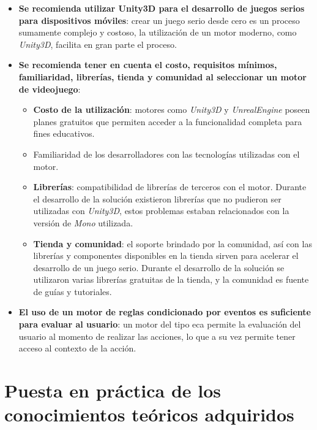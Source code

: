 \begin{itemize}

\item \textbf{Se recomienda utilizar Unity3D para el desarrollo de juegos serios para dispositivos móviles}: crear un juego serio desde cero es un proceso sumamente complejo y costoso, la utilización de un motor moderno, como \emph{Unity3D}, facilita en gran parte el proceso.

\item \textbf{Se recomienda tener en cuenta el costo, requisitos mínimos, familiaridad, librerías, tienda y comunidad al seleccionar un motor de videojuego}:

    \begin{itemize}

    \item \textbf{Costo de la utilización}: motores como \emph{Unity3D} y \emph{UnrealEngine} poseen planes gratuitos que permiten acceder a  la funcionalidad completa para fines educativos.

    \item Familiaridad de los desarrolladores con las tecnologías utilizadas con el motor.

    \item \textbf{Librerías}: compatibilidad de librerías de terceros con el motor. Durante el desarrollo de la solución existieron librerías que no pudieron ser utilizadas con \emph{Unity3D}, estos problemas estaban relacionados con la versión de \emph{Mono} utilizada.

    \item \textbf{Tienda y comunidad}: el soporte brindado  por la comunidad, así con las librerías y componentes disponibles en la tienda sirven para acelerar el desarrollo de un juego serio. Durante el desarrollo de la solución se utilizaron varias librerías gratuitas de la tienda, y la comunidad es fuente de guías y tutoriales.

    \end{itemize}

\item \textbf{El uso de un motor de reglas condicionado por eventos es suficiente para evaluar al usuario}: un motor del tipo \gls{eca} permite la evaluación del usuario al momento de realizar las acciones, lo que a su vez permite tener acceso al contexto de la acción.

\end{itemize}

\section[Puesta en práctica de conocimientos teóricos]%
{Puesta en práctica de los conocimientos teóricos adquiridos}


